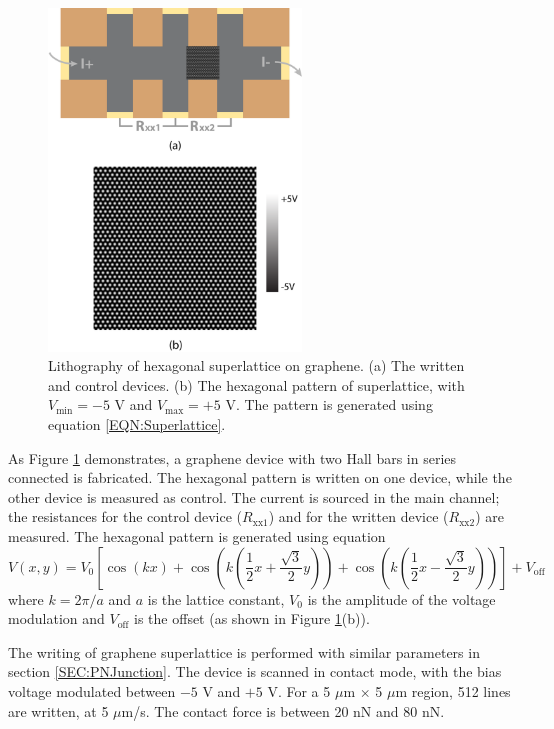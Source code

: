 \documentclass[pdflatex, sectionletters, 12pt]{pittetd}    %
\begin{document}
\begin{figure}[h!]
	\centering
	\includegraphics[width=0.6\textwidth]{Drawing/SuperlatticeWriting.pdf}
	\caption{Lithography of hexagonal superlattice on graphene. (a) The written and control devices. (b) The hexagonal pattern of superlattice, with $V_\mathrm{min} = -5$ V and $V_\mathrm{max} = +5$ V. The pattern is generated using equation \ref{EQN:Superlattice}.}
	\label{FIG:SuperlatticeWriting}
\end{figure}

As Figure \ref{FIG:SuperlatticeWriting} demonstrates, a graphene device with two Hall bars in series connected is fabricated. The hexagonal pattern is written on one device, while the other device is measured as control. The current is sourced in the main channel; the resistances for the control device ($R_\mathrm{xx1}$) and for the written device ($R_\mathrm{xx2}$) are measured. The hexagonal pattern is generated using equation
\begin{equation}
\label{EQN:Superlattice}
V(x, y) = V_0 \left[\cos(kx) + \cos\left( k \left( \frac{1}{2}  x + \frac{\sqrt{3}}{2} y \right) \right) + \cos \left( k \left( \frac{1}{2} x - \frac{\sqrt{3}}{2} y \right) \right) \right] + V_\mathrm{off}
\end{equation}
where $k = 2\pi/a$ and $a$ is the lattice constant, $V_0$ is the amplitude of the voltage modulation and $V_\mathrm{off}$ is the offset (as shown in Figure \ref{FIG:SuperlatticeWriting}(b)). 

The writing of graphene superlattice is performed with similar parameters in section \ref{SEC:PNJunction}. The device is scanned in contact mode, with the bias voltage modulated between $-5$ V and $+5$ V. For a 5 $\mu$m $\times$ 5 $\mu$m region, 512 lines are written, at 5 $\mu$m/s. The contact force is between 20 nN and 80 nN.
\end{document}
